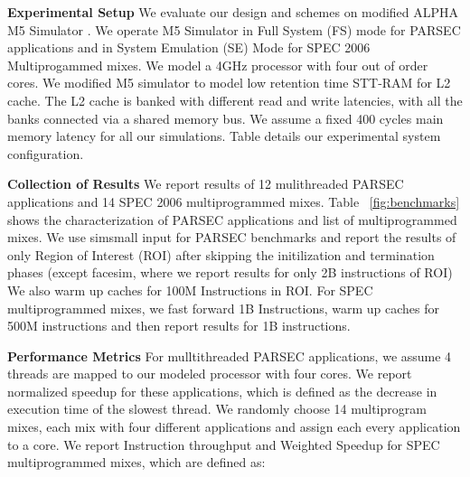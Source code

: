 


\noindent\textbf{Experimental Setup}
We evaluate our design and schemes on modified ALPHA M5 Simulator \cite{} . We operate M5 Simulator in Full System (FS) mode for PARSEC applications and in System Emulation (SE) Mode for SPEC 2006 Multiprogammed mixes. We model a 4GHz processor with four out of order cores. We modified M5  simulator to model low retention time STT-RAM for L2 cache. The L2 cache  is banked with different read and write latencies, with all the banks connected via a shared memory bus. We assume a fixed 400 cycles main memory latency for all our simulations. Table \cite{} details our experimental system configuration. 

\noindent\textbf{Collection of Results}
We report results of 12 mulithreaded PARSEC applications and 14 SPEC 2006  multiprogrammed mixes. Table ~\ref{fig:benchmarks} shows the characterization of PARSEC applications and list of multiprogrammed mixes.
We use simsmall input for PARSEC benchmarks and report the results of only Region of Interest (ROI) after skipping the initilization and termination phases (except facesim, where we report results for only 2B instructions of ROI) We also warm up caches for 100M Instructions in ROI. For SPEC multiprogrammed mixes, we fast forward 1B Instructions, warm up caches for 500M instructions and then report results for 1B instructions. 

\noindent\textbf{Performance Metrics}
For mulltithreaded PARSEC applications, we assume 4 threads are mapped to our modeled processor with four cores. We report normalized speedup for these applications, which is defined as the decrease in execution time of the slowest thread. We randomly choose 14 multiprogram mixes, each mix with four different applications and assign each every application to a core. 
We report Instruction throughput and Weighted Speedup for SPEC multiprogrammed mixes, which are defined as:

